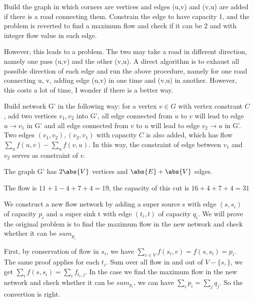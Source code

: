 \begin{cproblem}[26.1.6]
\end{cproblem}
\begin{csolution}
    Build the graph in which corners are vertices and edges (u,v) and (v,u) are added if there is a road connecting them. Constrain the edge to have capacity 1, and the problem is reverted to find a maximum flow and check if it can be 2 and with integer flow value in each edge.

    However, this leads to a problem. The two may take a road in different direction, namely one pass (u,v) and the other (v,u). A direct algorithm is to exhaust all possible direction of each edge and run the above procedure, namely for one road connecting u, v, adding edge (u,v) in one time and (v,u) in another. However, this costs a lot of time, I wonder if there is a better way.
\end{csolution}

\begin{cproblem}[26.1.7]
\end{cproblem}
\begin{csolution}
    Build network G' in the following way: for a vertex $v\in G$ with vertex constrant $C$, add two vertices $v_1,v_2$ into G', all edge connected from $u$ to $v$ will lead to edge $u\rightarrow v_1$ in G' and all edge connected from $v$ to $u$ will lead to edge $v_2\rightarrow u$ in G'. Two edges $(v_1,v_2),(v_2,v_1)$ with capacity $C$ is also added, which has flow $\sum_{u}f(u,v)-\sum_{u}f(v,u)$. In this way, the constraint of edge between $v_1$ and $v_2$ serves as constraint of $v$.

    The graph G' has $2\abs{V}$ vertices and $\abs{E}+\abs{V}$ edges.
\end{csolution}

\begin{cproblem}[26.2.2]
\end{cproblem}
\begin{csolution}
    The flow is $11+1-4+7+4=19$, the capacity of this cut is $16+4+7+4=31$
\end{csolution}

\begin{cproblem}[26.2.6]
\end{cproblem}
\begin{csolution}
    We construct a new flow network by adding a super source s with edge $(s,s_i)$ of capacity $p_i$ and a super sink t with edge $(t_i,t)$ of capacity $q_i$. We will prove the original problem is to find the maximum flow in the new network and check whether it can be $sum_{p_i}$

    First, by conservation of flow in $s_i$, we have $\sum_{v\in V}f(s_i,v)=f(s,s_i)=p_i$. The same proof applies for each $t_i$. Sum over all flow in and out of $V-\{s,\}$, we get $\sum_{i}f(s,s_i)=\sum_{i}f_{t_i,j}$. In the case we find the maximum flow in the new network and check whether it can be $sum_{p_i}$, we can have $\sum_ip_i=\sum_jq_j$. So the convertion is right.
\end{csolution}

